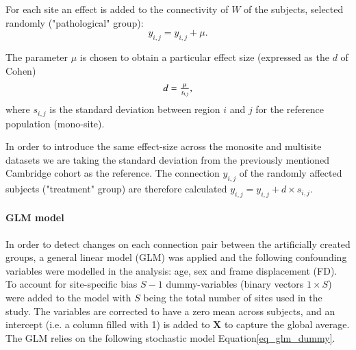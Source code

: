\documentclass[authoryear]{elsarticle}
\begin{document}
For each site an effect is added to the connectivity of $W$ of the subjects, selected randomly ("pathological" group):
\begin{equation}
	y_{i,j} = y_{i,j} + \mu.
\end{equation}

The parameter $\mu$ is chosen to obtain a particular effect size (expressed as the $d$ of Cohen)
\begin{equation}
\label{eq_cohen}
   \begin{array}{l l}
     d = \frac{\mu}{s_{i,j}},     
   \end{array}
\end{equation}
where $s_{i,j}$ is the standard deviation between region $i$ and $j$ for the reference population (mono-site). 

In order to introduce the same effect-size across the monosite and multisite datasets we are taking the standard deviation from the previously mentioned Cambridge cohort as the reference.  The connection $y_{i,j}$ of the randomly affected subjects ("treatment" group) are therefore calculated $y_{i,j} = y_{i,j} + d\times s_{i,j}$.

\paragraph{GLM model}
In order to detect changes on each connection pair between the artificially created groups, a general linear model (GLM) was applied and the following confounding variables were modelled in the analysis: age, sex and frame displacement (FD). To account for site-specific bias $S-1$ dummy-variables (binary vectors $1\times S$) were added to the model with $S$ being the total number of sites used in the study. The variables are corrected to have a zero mean across subjects, and an intercept (i.e. a column filled with 1) is added to $\mathbf{X}$ to capture the global average. The GLM relies on the following stochastic model Equation\ref{eq_glm_dummy}.
\end{document}
